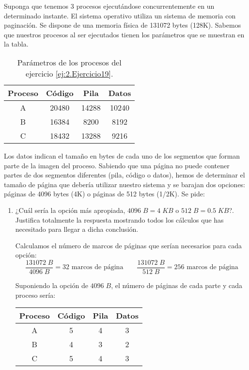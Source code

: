 \begin{ejercicio}\label{ej:2.Ejercicio19}
    Suponga que tenemos 3 procesos ejecutándose concurrentemente en un determinado instante. El sistema operativo utiliza un sistema de memoria con paginación. Se dispone de una memoria física de 131072 bytes (128K). Sabemos que nuestros procesos al ser ejecutados tienen los parámetros que se muestran en la tabla.
    \begin{table}[H]
        \centering
        \begin{tabular}{|c|c|c|c|}
            \hline
            \textbf{Proceso} & \textbf{Código} & \textbf{Pila} &
            \textbf{Datos}\\ \hline
            A & 20480 & 14288 & 10240 \\ \hline
            B & 16384 & 8200 & 8192 \\ \hline
            C & 18432 & 13288 & 9216 \\ \hline
        \end{tabular}
        \caption{Parámetros de los procesos del ejercicio \ref{ej:2.Ejercicio19}.}
        \label{tab:ej19}
    \end{table}

    Los datos indican el tamaño en bytes de cada uno de los segmentos que forman parte de la imagen del proceso. Sabiendo que una página no puede contener partes de dos segmentos diferentes (pila, código o datos), hemos de determinar el tamaño de página que debería utilizar nuestro sistema y se barajan dos opciones: páginas de 4096 bytes (4K) o páginas de 512 bytes (1/2K). Se pide:
    \begin{enumerate}
        \item ¿Cuál sería la opción más apropiada, $4096\;B=4\;KB$ o $512\;B=0.5\;KB$?. Justifica totalmente la respuesta mostrando todos los cálculos que has necesitado para llegar a dicha conclusión.

        Calculamos el número de marcos de páginas que serían necesarios para cada opción:
        \begin{equation*}
            \frac{131072\;B}{4096\;B} = 32 \text{ marcos de página}
            \qquad
            \frac{131072\;B}{512\;B} = 256 \text{ marcos de página}
        \end{equation*}

        Suponiendo la opción de $4096\;B$, el número de páginas de cada parte y cada proceso sería:
        \begin{table}[H]
            \centering
            \begin{tabular}{|c|c|c|c|}
                \hline
                \textbf{Proceso} & \textbf{Código} & \textbf{Pila} &
                \textbf{Datos}\\ \hline
                A & 5 & 4 & 3 \\ \hline
                B & 4 & 3 & 2 \\ \hline
                C & 5 & 4 & 3 \\ \hline
            \end{tabular}
        \end{table}
        

\end{enumerate}
\end{ejercicio}
